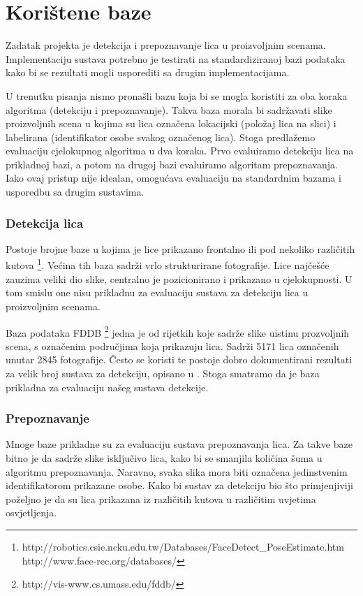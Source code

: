 \documentclass[times, utf8, seminar, numeric]{fer}
\begin{document}
\section{Korištene baze}

Zadatak projekta je detekcija i prepoznavanje lica u proizvoljnim scenama. Implementaciju sustava potrebno
je testirati na standardiziranoj bazi podataka kako bi se rezultati mogli usporediti sa
drugim implementacijama.

U trenutku pisanja nismo pronašli bazu koja bi se mogla koristiti za oba koraka algoritma (detekciju i
prepoznavanje). Takva baza morala bi sadržavati slike proizvoljnih scena u kojima su lica označena
lokacijski (položaj lica na slici) i labelirana (identifikator osobe svakog označenog lica). Stoga
predlažemo evaluaciju cjelokupnog algoritma u dva koraka. Prvo evaluiramo detekciju lica na prikladnoj
bazi, a potom na drugoj bazi evaluiramo algoritam prepoznavanja. Iako ovaj pristup nije idealan, omogućava
evaluaciju na standardnim bazama i usporedbu sa drugim sustavima.

\subsubsection{Detekcija lica}

Postoje brojne baze u kojima je lice prikazano frontalno ili pod nekoliko različitih
kutova \footnote{http://robotics.csie.ncku.edu.tw/Databases/FaceDetect\_PoseEstimate.htm \\
http://www.face-rec.org/databases/}. Većina tih baza sadrži vrlo strukturirane fotografije. Lice najčešće
zauzima veliki dio slike, centralno je pozicionirano i prikazano u cjelokupnosti. U tom smislu one
nisu prikladnu za evaluaciju sustava za detekciju lica u proizvoljnim scenama.

Baza podataka
FDDB \footnote{http://vis-www.cs.umass.edu/fddb/} jedna je od rijetkih koje sadrže slike uistinu
prozvoljnih scena, s označenim područjima koja prikazuju lica. Sadrži 5171 lica označenih
unutar 2845 fotografije. Često se koristi te postoje
dobro dokumentirani rezultati za velik broj sustava za detekciju, opisano u 
\cite{fddbTech}. Stoga smatramo da je baza prikladna za evaluaciju našeg sustava detekcije.

\subsubsection{Prepoznavanje}

Mnoge baze prikladne su za evaluaciju sustava prepoznavanja lica. Za takve baze bitno je da
sadrže slike isključivo lica, kako bi se smanjila količina šuma u algoritmu prepoznavanja. Naravno,
svaka slika mora biti označena jedinstvenim identifikatorom prikazane osobe. Kako bi sustav za
detekciju bio što primjenjiviji poželjno je da su lica prikazana iz različitih kutova u različitim
uvjetima osvjetljenja.
\end{document}
